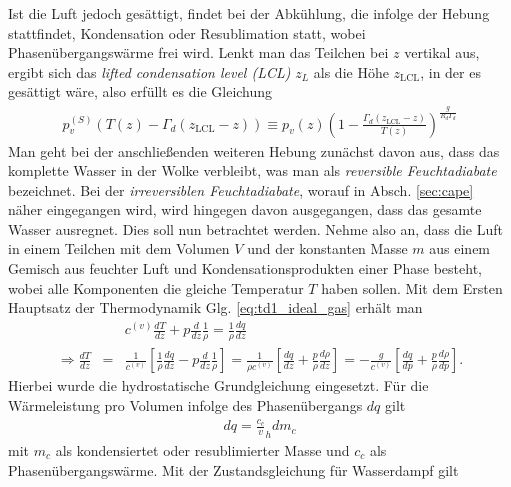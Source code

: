 \documentclass{book}
\begin{document}
Ist die Luft jedoch gesättigt, findet bei der Abkühlung, die infolge der Hebung stattfindet, Kondensation oder Resublimation statt, wobei Phasenübergangswärme frei wird. Lenkt man das Teilchen bei $z$ vertikal aus, ergibt sich das \textit{lifted condensation level (LCL)} $z_L$ als die Höhe $z_{\text{LCL}}$, in der es gesättigt wäre, also erfüllt es die Gleichung
%
\begin{eqnarray}
p_v^{(S)}\left(T\left(z\right) - \Gamma_d\left(z_{\text{LCL}} - z\right)\right) \equiv p_v\left(z\right)\left(1 - \frac{\Gamma_d\left(z_{\text{LCL}} - z\right)}{T\left(z\right)}\right)^{\frac{g}{R_d\Gamma_d}}
\end{eqnarray}
%
Man geht bei der anschließenden weiteren Hebung zunächst davon aus, dass das komplette Wasser in der Wolke verbleibt, was man als \textit{reversible Feuchtadiabate} bezeichnet. Bei der \textit{irreversiblen Feuchtadiabate}, worauf in Absch. \ref{sec:cape} näher eingegangen wird, wird hingegen davon ausgegangen, dass das gesamte Wasser ausregnet. Dies soll nun betrachtet werden. Nehme also an, dass die Luft in einem Teilchen mit dem Volumen $V$ und der konstanten Masse $m$ aus einem Gemisch aus feuchter Luft und Kondensationsprodukten einer Phase besteht, wobei alle Komponenten die gleiche Temperatur $T$ haben sollen. Mit dem Ersten Hauptsatz der Thermodynamik Glg. \eqref{eq:td1_ideal_gas} erhält man
%
\begin{eqnarray}
&&c^{(v)}\frac{dT}{dz} + p\frac{d}{dz}\frac{1}{\rho} = \frac{1}{\rho}\frac{dq}{dz}\nonumber\\
\Rightarrow\frac{dT}{dz} & = & \frac{1}{c^{(v)}}\left[\frac{1}{\rho}\frac{dq}{dz} - p\frac{d}{dz}\frac{1}{\rho}\right] = \frac{1}{\rho c^{(v)}}\left[\frac{dq}{dz} + \frac{p}{\rho}\frac{d\rho}{dz}\right] = -\frac{g}{c^{(v)}}\left[\frac{dq}{dp} + \frac{p}{\rho}\frac{d\rho}{dp}\right].\label{eq:feuchtad_deriv_1}
\end{eqnarray}
%
Hierbei wurde die hydrostatische Grundgleichung eingesetzt. Für die Wärmeleistung pro Volumen infolge des Phasenübergangs $dq$ gilt
%
\begin{eqnarray}
dq = \frac{c_{c}}{v}_hdm_c
\end{eqnarray}
%
mit $m_c$ als kondensiertet oder resublimierter Masse und $c_{c}$ als Phasenübergangswärme. Mit der Zustandsgleichung für Wasserdampf gilt
\end{document}
